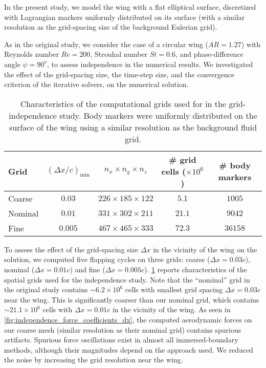 In the present study, we model the wing with a flat elliptical surface, discretized with Lagrangian markers uniformly distributed on its surface (with a similar resolution as the grid-spacing size of the background Eulerian grid).

As in the original study, we consider the case of a circular wing ($AR = 1.27$) with Reynolds number $Re = 200$, Strouhal number $St = 0.6$, and phase-difference angle $\psi = 90^o$, to assess independence in the numerical results.
We investigated the effect of the grid-spacing size, the time-step size, and the convergence criterion of the iterative solvers, on the numerical solution.

\begin{table}[!h]
  \centering
  \begin{tabular}{lcccc}
    \hline\hline
    Grid & $(\Delta x / c)_\text{min}$ & $n_x \times n_y \times n_z$ & \# grid cells ($\times 10^6$) & \# body markers \\
    \hline
    Coarse & $0.03$ & $226 \times 185 \times 122$ & $5.1$ & $1005$ \\
    Nominal & $0.01$ & $331 \times 302 \times 211$ & $21.1$ & $9042$ \\
    Fine & $0.005$ & $467 \times 465 \times 333$ & $72.3$ & $36158$ \\
    \hline\hline
  \end{tabular}
  \caption{Characteristics of the computational grids used for in the grid-independence study. Body markers were uniformly distributed on the surface of the wing using a similar resolution as the background fluid grid.}
  \label{tab:independence_grid_charateristics}
\end{table}

To assess the effect of the grid-spacing size $\Delta x$ in the vicinity of the wing on the solution, we computed five flapping cycles on three grids: coarse ($\Delta x = 0.03c$), nominal ($\Delta x = 0.01c$) and fine ($\Delta x = 0.005c$).
\cref{tab:independence_grid_charateristics} reports characteristics of the spatial grids used for the independence study.
Note that the ``nominal'' grid in the original study contains $\sim 6.2 \times 10^6$ cells with smallest grid spacing $\Delta x = 0.03c$ near the wing.
This is significantly coarser than our nominal grid, which contains $\sim 21.1 \times 10^6$ cells with $\Delta x = 0.01c$ in the vicinity of the wing.
As seen in \cref{fig:independence_force_coefficients_dx}, the computed aerodynamic forces on our coarse mesh (similar resolution as their nominal grid) contains spurious artifacts.
Spurious force oscillations exist in almost all immersed-boundary methods, although their magnitudes depend on the approach used.
We reduced the noise by increasing the grid resolution near the wing.

